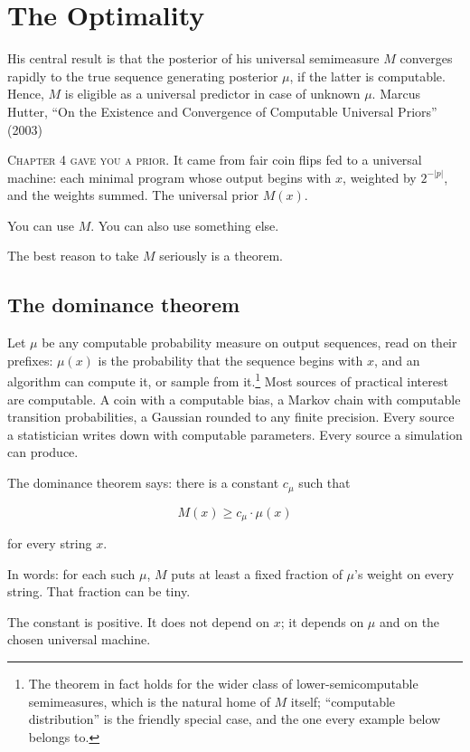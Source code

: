 \chapter{The Optimality}

\chapterepigraph
{His central result is that the posterior of his universal semimeasure $M$ converges rapidly to the true sequence generating posterior $\mu$, if the latter is computable. Hence, $M$ is eligible as a universal predictor in case of unknown $\mu$.}
{Marcus Hutter, ``On the Existence and Convergence of Computable Universal Priors'' (2003)}

\noindent \textsc{Chapter 4 gave you a prior.} It came from fair coin flips fed to a universal machine: each minimal program whose output begins with $x$, weighted by $2^{-|p|}$, and the weights summed. The universal prior $M(x)$.

You can use $M$. You can also use something else.

The best reason to take $M$ seriously is a theorem.

\section*{The dominance theorem}

Let $\mu$ be any computable probability measure on output sequences, read on their prefixes: $\mu(x)$ is the probability that the sequence begins with $x$, and an algorithm can compute it, or sample from it.\footnote{The theorem in fact holds for the wider class of lower-semicomputable semimeasures, which is the natural home of $M$ itself; ``computable distribution'' is the friendly special case, and the one every example below belongs to.} Most sources of practical interest are computable. A coin with a computable bias, a Markov chain with computable transition probabilities, a Gaussian rounded to any finite precision. Every source a statistician writes down with computable parameters. Every source a simulation can produce.

The dominance theorem says: there is a constant $c_\mu$ such that

$$M(x) \geq c_\mu \cdot \mu(x)$$

for every string $x$.

In words: for each such $\mu$, $M$ puts at least a fixed fraction of $\mu$'s weight on every string. That fraction can be tiny.

The constant is positive. It does not depend on $x$; it depends on $\mu$ and on the chosen universal machine.


